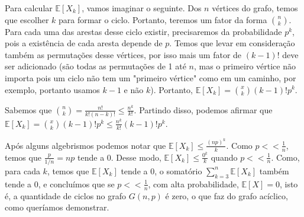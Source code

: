 \documentclass{article}
\begin{document}
\begin{itemize}
	      Para calcular \(\mathbb{E}[X_k]\), vamos imaginar o seguinte. Dos \(n\) vértices do grafo, temos que escolher \(k\) para formar o ciclo. Portanto, teremos um fator
	      da forma \(\binom{n}{k}\). Para cada uma das arestas desse ciclo existir, precisaremos da probabilidade \(p^k\), pois a existência de cada aresta depende de \(p\).
	      Temos que levar em consideração também as permutações desse vértices, por isso mais um fator de \((k-1)!\) deve ser adicionado (são todas as permutações de 1 até \(n\), mas o primeiro vértice não importa pois um ciclo não
	      tem um "primeiro vértice" como em um caminho, por exemplo, portanto usamos \(k-1\) e não \(k\)). Portanto, \(\mathbb{E}[X_k] = \binom{x}{k}(k-1)!p^k\).

	      Sabemos que \(\binom{n}{k} = \frac{n!}{k!(n-k)!} \leq \frac{n^k}{k!}\). Partindo disso, podemos afirmar que \(\mathbb{E}[X_k] = \binom{x}{k}(k-1)!p^k \leq \frac{n^k}{k!}(k-1)!p^k\).

	      Após alguns algebrismos podemos notar que \(\mathbb{E}[X_k] \leq \frac{(np)^k}{k}\). Como \(p << \frac{1}{n}\), temos que \(\frac{p}{1/n} = np\) tende a 0. Desse modo,
	      \(\mathbb{E}[X_k] \leq \frac{0^k}{k}\) quando \(p << \frac{1}{n}\). Como, para cada \(k\), temos que \(\mathbb{E}[X_k]\) tende a 0, o somatório \(\sum_{k=3}^n \mathbb{E}[X_k]\) também tende a 0,
	      e concluímos que se \(p << \frac{1}{n}\), com alta probabilidade, \(\mathbb{E}[X] = 0\), isto é, a quantidade de ciclos no grafo \(G(n, p)\) é zero, o que faz do grafo
	      acíclico, como queríamos demonstrar.




\end{itemize}
\end{document}

